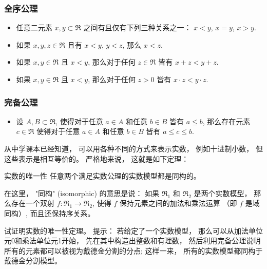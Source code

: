\subsubsection{全序公理}
\begin{itemize}
\item 任意二元素 $x,y\subset\mathfrak{R}$ 之间有且仅有下列三种关系之一： $x<y$, $x=y$, $x>y$.
\item 如果 $x,y,z\in\mathfrak{R}$ 且有 $x<y$, $y<z$, 那么 $x<z$.
\item 如果 $x,y\in\mathfrak{R}$ 且 $x<y$, 那么对于任何 $z\in\mathfrak{R}$ 皆有 $x+z<y+z$.
\item 如果 $x,y\in\mathfrak{R}$ 且 $x<y$, 那么对于任何 $z>0$ 皆有 $x\cdot z<y\cdot z$.
\end{itemize}

\subsubsection{完备公理}
\begin{itemize}
\item 设 $A,B\subset\mathfrak{R}$, 使得对于任意 $a\in A$ 和任意 $b\in B$ 皆有 $a\leq b$, 那么存在元素 $c\in\mathfrak{R}$ 使得对于任意 $a\in A$ 和任意 $b\in B$ 皆有 $a\leq c\leq b$.
\end{itemize}

从中学课本已经知道， 可以用各种不同的方式来表示实数， 例如十进制小数， 但这些表示是相互等价的。 严格地来说， 这就是如下定理：
\begin{theorem}{实数的唯一性}
任意两个满足实数公理的实数模型都是同构的。
\end{theorem}
在这里， "同构" (isomorphic) 的意思是说： 如果 $\mathfrak{R}_1$ 和 $\mathfrak{R}_2$ 是两个实数模型， 那么存在一个双射 $f:\mathfrak{R}_1\to \mathfrak{R}_2$, 使得 $f$ 保持元素之间的加法和乘法运算 （即 $f$ 是域同构）, 而且还保持序关系。

\begin{exercise}{}
试证明实数的唯一性定理。 提示： 若给定了一个实数模型， 那么可以从加法单位元0和乘法单位元1开始， 先在其中构造出整数和有理数， 然后利用完备公理说明所有的元素都可以被视为戴德金分割的分点; 这样一来， 所有的实数模型都同构于戴德金分割模型。
\end{exercise}
